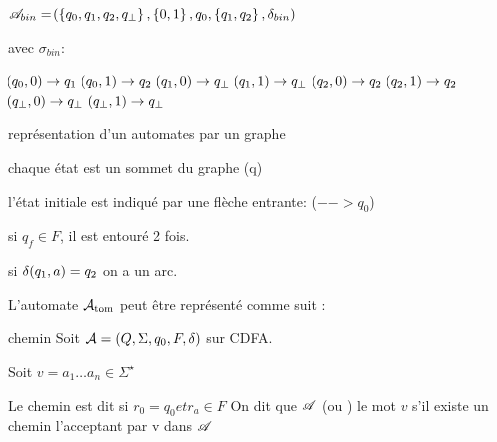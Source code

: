     \begin{example}{}{}
        $\mathscr{A}_{bin} = \!\left(\left\{q_0, q_1, q_2, q_\bot\right\}, \left\{0, 1\right\}, q_0, \left\{q_1, q_2\right\}, \delta_{bin}\right)$
        
        avec $\sigma_{bin} :$
        \begin{enumerate}
            \itt $\!\left(q_0, 0\right) \to q_1$
            \itt $\!\left(q_0, 1\right) \to q_2$
            \itt $\!\left(q_1, 0\right) \to q_\bot$
            \itt $\!\left(q_1, 1\right) \to q_\bot$
            \itt $\!\left(q_2, 0\right) \to q_2$
            \itt $\!\left(q_2, 1\right) \to q_2$
            \itt $\!\left(q_\bot, 0\right) \to q_\bot$
            \itt $\!\left(q_\bot, 1\right) \to q_\bot$
        \end{enumerate}
    \end{example}
    \begin{notation}
        représentation d'un automates par un graphe
        
        \begin{enumerate}
            \itt chaque état est un sommet du graphe (q)
            
            \itt l'état initiale est indiqué par une flèche entrante: ($--> q_0$)
            
            \itt si $q_f \in F$, il est entouré 2 fois.
            
            \itt si $\delta \!\left(q_1, a\right) = q_2$ on a un arc.
            
            
        \end{enumerate}
        
        
    \end{notation}
     
    \begin{example}{}{}
        L'automate $\mathop{\mathcal{A}_\text{tom}}\nolimits$ peut être représenté comme suit :
        
        
        
    \end{example}
    \begin{definition}{chemin}{}
        Soit $\mathcal{A} = (Q,\Sigma, q_0, F, \delta)$ sur CDFA.
        
        
        Soit $v = a_1 \dots a_n  \in \Sigma^\star$ 
        
        Le chemin est dit  si $r_0 = q_0 et r_a \in F$
        On dit que $\mathscr{A}$  (ou ) le mot $v$ s'il existe un chemin l'acceptant par v dans $\mathscr{A}$
        
    \end{definition}
    

